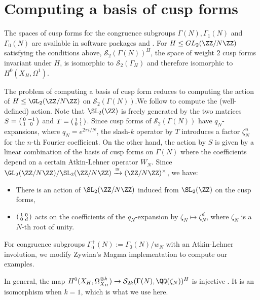 \section{Computing a basis of cusp forms}\label{basis:zyinwa}

The spaces of cusp forms for the congruence subgroups $\Gamma(N), \Gamma_1(N)$ and $\Gamma_0(N)$ are available in software packages \cite{sagemath} and \cite{magma}. For $H \leq GL_2(\ZZ/N\ZZ)$ satisfying the conditions above, $\mathcal{S}_2(\Gamma(N))^H$, the space of weight $2$ cusp forms invariant under $H$, is isomorphic to $\mathcal{S}_2(\Gamma_H)$ and therefore isomorphic to $H^0(X_H,\Omega^1)$.

The problem of computing a basis of cusp form reduces to computing the action of $H \leq \GL_2(\ZZ/N\ZZ)$ on $\mathcal{S}_2(\Gamma(N))$.We follow \cite{Zywina2020ComputingAO,Brunault2020} to compute the (well-defined) action. Note that $\SL_2(\ZZ)$ is freely generated by the two matrices $S = \begin{psmallmatrix} 0 & -1 \\ 1 & 0 \end{psmallmatrix}$ and $T = \begin{psmallmatrix} 1 & 1 \\ 0 & 1 \end{psmallmatrix}$. Since cusp forms of $\mathcal{S}_2(\Gamma(N))$ have $q_N$-expansions, where $q_N = e^{2\pi i /N}$, the slash-$k$ operator by $T$ introduces a factor $\zeta_N^n$ for the $n$-th Fourier coefficient. On the other hand, the action by $S$ is given by a linear combination of the basis of cusp forms on $\Gamma(N)$ where the coefficients depend on a certain Atkin-Lehner operator $W_N$. Since $\GL_2(\ZZ/N\ZZ)/\SL_2(\ZZ/N\ZZ) \xrightarrow{\cong} (\ZZ/N\ZZ)^\times$, we have:

\begin{itemize}
    \item There is an action of $\SL_2(\ZZ/N\ZZ)$ induced from $\SL_2(\ZZ)$ on the cusp forms,
    \item $\begin{psmallmatrix} 1 & 0 \\ 0 & d \end{psmallmatrix}$ acts on the coefficients of the $q_N$-expansion by $\zeta_N \mapsto \zeta_N^d$, where $\zeta_N$ is a $N$-th root of unity. 
\end{itemize}

For congruence subgroups $\Gamma_0^+(N) := \Gamma_0(N)/w_N$ with an Atkin-Lehner involution, we modify Zywina's Magma implementation to compute our examples.

\begin{remark}
In general, the map $H^0(X_H, \Omega_{X_H}^{\otimes k}) \rightarrow \mathcal{S}_{2k}(\Gamma(N),\QQ(\zeta_N))^H$ is injective \cite{Zywina2020ComputingAO}. It is an isomorphism when $k = 1$, which is what we use here.
\end{remark}